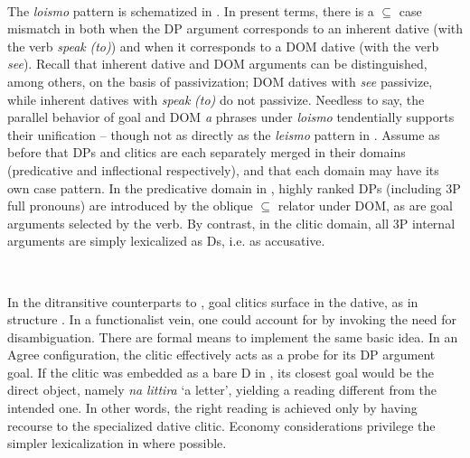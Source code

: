\documentclass[output=paper]{langscibook}
\begin{document}
\ea\label{ex:key:}
\langinfo{}{}{ [\textsubscript{IP} [\textsubscript{${\subseteq}$} le]  [\textsubscript{I} vi   [\textsubscript{ VP} vi  [\textsubscript{${\subseteq}$P} a la niña]]    (cf. \REF{ex:key:23b})}\\
\z

The \textit{loismo} pattern is schematized in . In present terms, there is a ${\subseteq}$ case mismatch in  both when the DP argument corresponds to an inherent dative (with the verb \textit{speak} \textit{(to)}) and when it corresponds to a DOM dative (with the verb \textit{see}). Recall that inherent dative and DOM arguments can be distinguished, among others, on the basis of passivization; DOM datives with \textit{see} passivize, while inherent datives with \textit{speak} \textit{(to)} do not passivize. Needless to say, the parallel behavior of goal and DOM \textit{a} phrases under \textit{loismo} tendentially supports their unification – though not as directly as the \textit{leismo} pattern in . Assume as before that DPs and clitics are each separately merged in their domains (predicative and inflectional respectively), and that each domain may have its own case pattern. In the predicative domain in , highly ranked DPs (including 3P full pronouns) are introduced by the oblique ${\subseteq}$ relator under DOM, as are goal arguments selected by the verb. By contrast, in the clitic domain, all 3P internal arguments are simply lexicalized as Ds, i.e. as accusative.

\ea\label{ex:key:}
\langinfo{}{}{[\textsubscript{IP} [\textsubscript{D} u] [\textsubscript{I} parlanu/viðinu   [\textsubscript{ VP} parlanu/viðinu  [\textsubscript{${\subseteq}$P} a iddu]]                    (cf. \REF{ex:key:21a})} \\
\z

In the ditransitive counterparts to , goal clitics surface in the dative, as in structure . In a functionalist vein, one could account for  by invoking the need for disambiguation. There are formal means to implement the same basic idea. In an Agree configuration, the clitic effectively acts as a probe for its DP argument goal. If the clitic was embedded as a bare D in , its closest goal would be the direct object, namely \textit{na} \textit{littira} ‘a letter’, yielding a reading different from the intended one. In other words, the right reading is achieved only by having recourse to the specialized dative clitic. Economy considerations privilege the simpler lexicalization in  where possible.
\end{document}
